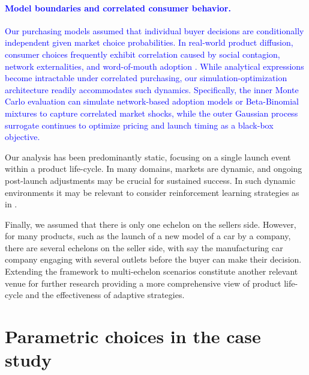 \documentclass[a4paper,fleqn, 11pt]{cas-sc}
\begin{document}
\paragraph{\textcolor{blue}{Model boundaries and correlated consumer behavior.}}
\textcolor{blue}{Our purchasing models assumed that individual buyer decisions are conditionally independent given market choice probabilities. In real-world product diffusion, consumer choices frequently exhibit correlation caused by social contagion, network externalities, and word-of-mouth adoption \citep{bass1969new}. While analytical expressions become intractable under correlated purchasing, our simulation-optimization architecture readily accommodates such dynamics. Specifically, the inner Monte Carlo evaluation can simulate network-based adoption models or Beta-Binomial mixtures to capture correlated market shocks, while the outer Gaussian process surrogate continues to optimize pricing and launch timing as a black-box objective.}

Our analysis has been predominantly static, focusing on a single launch event within a product life-cycle. In 
many domains, markets are dynamic, and ongoing post-launch adjustments may be crucial for sustained success. In such dynamic environments it may be relevant to consider reinforcement learning strategies as in \cite{gao2022dynamic}. 

  Finally, we assumed that there is only one echelon on the sellers side. However, for many products, such as the launch of a new model of a car by a company, there are several echelons on the seller side, with say the manufacturing car company engaging with several outlets before the buyer can make their decision.  
  Extending the framework to multi-echelon scenarios constitute another relevant venue for further research 
  providing a more comprehensive view of product life-cycle and the effectiveness of adaptive strategies.



\appendix


\section{Parametric choices in the case study}\label{kkappendix}
\end{document}
